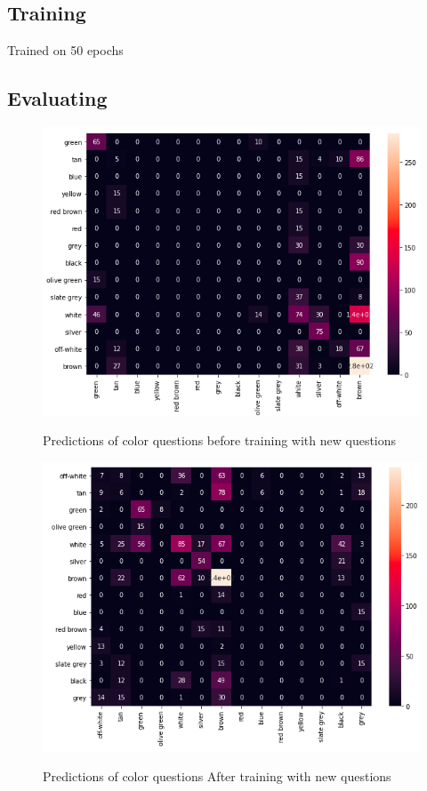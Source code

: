



\subsection{Training}

Trained on 50 epochs 


\subsection{Evaluating}

\begin{figure}[H]
\includegraphics[scale=0.45]{latex/images/Heatmapbefore.png}
\label{fig:Heatmapbefore}
\caption{Predictions of color questions before training with new questions}
\end{figure}

\begin{figure}[H]
\includegraphics[scale=0.45]{latex/images/HeatmapAfter.png}
\label{fig:HeatmapAfter}
\caption{Predictions of color questions After training with new questions}
\end{figure}

